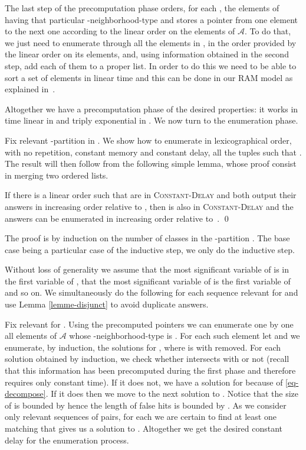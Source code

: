 \documentclass{LMCS}
\newcommand{\CDlin}{{\textsc{Constant-}\textsc{Delay}}\xspace}
\newcommand\cA{\ensuremath{{\mathcal A}}\xspace}
\begin{document}
  The last step of the precomputation phase orders, for each , the elements of  having that particular
  -neighborhood-type and stores a pointer from one element to the next
  one according to the linear order on the elements of \cA. To do that, we just
  need to enumerate through all the elements in , in the order provided by
  the linear order on its elements, and, using information obtained in the
  second step, add each of them to a proper list. In order to do this we need
  to be able to sort a set of elements in linear time and this can be done in
  our RAM model as explained in~\cite{Grandjean96}.

  Altogether we have a precomputation phase of the desired properties: it works
  in time linear in  and triply exponential in . We now turn to
  the enumeration phase.

  Fix relevant -partition  in . We show how to
  enumerate in lexicographical order, with no repetition, constant memory and
  constant delay, all the tuples  such that .
  The result will then follow from the following simple lemma, whose proof
  consist in merging two ordered lists.

  \begin{lem}\label{lemme-disjunct}
    If there is a linear order  such that  are in \CDlin and both
    output their answers in increasing order relative to , then 
    is also in \CDlin and the answers can be enumerated in increasing order
    relative to~. \qed
  \end{lem}

 The proof is by induction on the number  of classes in the -partition
 . The base case being a particular case of the inductive step, we only do
 the inductive step.

 Without loss of generality we assume that the most significant variable of
  is in the first variable of , that the most significant
 variable of  is the first variable of 
 and so on. We simultaneously do the following for each sequence
  relevant for  and use Lemma \ref{lemme-disjunct}
 to avoid duplicate answers.

 Fix  relevant for .
 Using the precomputed pointers we can enumerate one by one all elements 
 of \cA whose -neighborhood-type is . For each such element
 let  and we enumerate, by induction, the solutions for
 ,
 where  is  with  removed. For each
 solution  obtained by induction, we check whether 
 intersects with  or not (recall that this information has been
 precomputed during the first phase and therefore requires only constant time).
 If it does not, we have a solution
  for  because of \eqref{eq-decompose}. If it does then
 we move to the next solution to . Notice that the size of  is bounded
 by  hence the length of false hits is bounded by . As we
 consider only relevant sequences of pairs, for each  we are certain to find
 at least one matching  that gives us a solution  to .
 Altogether we get the desired constant delay for the enumeration process.
\end{document}
